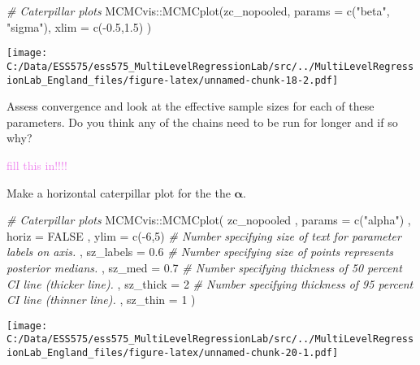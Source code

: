 \documentclass[
]{article}
\newenvironment{Shaded}{\begin{snugshade}}{\end{snugshade}}
\newcommand{\AttributeTok}[1]{\textcolor[rgb]{0.77,0.63,0.00}{#1}}
\newcommand{\CommentTok}[1]{\textcolor[rgb]{0.56,0.35,0.01}{\textit{#1}}}
\newcommand{\ConstantTok}[1]{\textcolor[rgb]{0.00,0.00,0.00}{#1}}
\newcommand{\DecValTok}[1]{\textcolor[rgb]{0.00,0.00,0.81}{#1}}
\newcommand{\FloatTok}[1]{\textcolor[rgb]{0.00,0.00,0.81}{#1}}
\newcommand{\FunctionTok}[1]{\textcolor[rgb]{0.00,0.00,0.00}{#1}}
\newcommand{\NormalTok}[1]{#1}
\newcommand{\SpecialCharTok}[1]{\textcolor[rgb]{0.00,0.00,0.00}{#1}}
\newcommand{\StringTok}[1]{\textcolor[rgb]{0.31,0.60,0.02}{#1}}
\begin{document}
\begin{Shaded}
\begin{Highlighting}[]
\CommentTok{\# Caterpillar plots}
\NormalTok{MCMCvis}\SpecialCharTok{::}\FunctionTok{MCMCplot}\NormalTok{(zc\_nopooled, }\AttributeTok{params =} \FunctionTok{c}\NormalTok{(}\StringTok{"beta"}\NormalTok{, }\StringTok{"sigma"}\NormalTok{), }\AttributeTok{xlim =} \FunctionTok{c}\NormalTok{(}\SpecialCharTok{{-}}\FloatTok{0.5}\NormalTok{,}\FloatTok{1.5}\NormalTok{) )}
\end{Highlighting}
\end{Shaded}

\texttt{[image: C:/Data/ESS575/ess575\_MultiLevelRegressionLab/src/../MultiLevelRegressionLab\_England\_files/figure-latex/unnamed-chunk-18-2.pdf]}

Assess convergence and look at the effective sample sizes for each of
these parameters. Do you think any of the chains need to be run for
longer and if so why?

\textcolor{violet}{fill this in!!!!}

Make a horizontal caterpillar plot for the the \(\boldsymbol{\alpha}\).

\begin{Shaded}
\begin{Highlighting}[]
\CommentTok{\# Caterpillar plots}
\NormalTok{MCMCvis}\SpecialCharTok{::}\FunctionTok{MCMCplot}\NormalTok{(}
\NormalTok{  zc\_nopooled}
\NormalTok{  , }\AttributeTok{params =} \FunctionTok{c}\NormalTok{(}\StringTok{"alpha"}\NormalTok{)}
\NormalTok{  , }\AttributeTok{horiz =} \ConstantTok{FALSE}
\NormalTok{  , }\AttributeTok{ylim =} \FunctionTok{c}\NormalTok{(}\SpecialCharTok{{-}}\DecValTok{6}\NormalTok{,}\DecValTok{5}\NormalTok{)}
  \CommentTok{\# Number specifying size of text for parameter labels on axis.}
\NormalTok{  , }\AttributeTok{sz\_labels =} \FloatTok{0.6}
  \CommentTok{\# Number specifying size of points represents posterior medians.}
\NormalTok{  , }\AttributeTok{sz\_med =} \FloatTok{0.7}
  \CommentTok{\# Number specifying thickness of 50 percent CI line (thicker line).}
\NormalTok{  , }\AttributeTok{sz\_thick =} \DecValTok{2}
  \CommentTok{\# Number specifying thickness of 95 percent CI line (thinner line).}
\NormalTok{  , }\AttributeTok{sz\_thin =} \DecValTok{1}
\NormalTok{)}
\end{Highlighting}
\end{Shaded}

\texttt{[image: C:/Data/ESS575/ess575\_MultiLevelRegressionLab/src/../MultiLevelRegressionLab\_England\_files/figure-latex/unnamed-chunk-20-1.pdf]}
\end{document}
